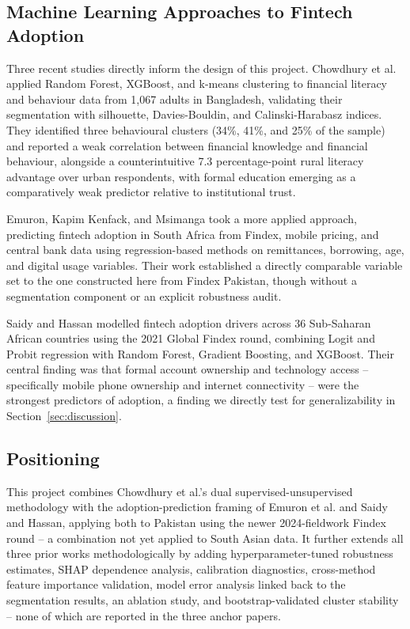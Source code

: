 \documentclass[conference]{IEEEtran}
\begin{document}
\subsection{Machine Learning Approaches to Fintech Adoption}
\label{subsec:ml_approaches_fintech_adoption}
Three recent studies directly inform the design of this project. Chowdhury et al. \cite{chowdhury2026} applied Random Forest, XGBoost, and k-means clustering to financial literacy and behaviour data from 1{,}067 adults in Bangladesh, validating their segmentation with silhouette, Davies-Bouldin, and Calinski-Harabasz indices. They identified three behavioural clusters (34\%, 41\%, and 25\% of the sample) and reported a weak correlation between financial knowledge and financial behaviour, alongside a counterintuitive 7.3 percentage-point rural literacy advantage over urban respondents, with formal education emerging as a comparatively weak predictor relative to institutional trust.
 
Emuron, Kapim Kenfack, and Msimanga \cite{emuron2025} took a more applied approach, predicting fintech adoption in South Africa from Findex, mobile pricing, and central bank data using regression-based methods on remittances, borrowing, age, and digital usage variables. Their work established a directly comparable variable set to the one constructed here from Findex Pakistan, though without a segmentation component or an explicit robustness audit.
 
Saidy and Hassan \cite{saidy2025} modelled fintech adoption drivers across 36 Sub-Saharan African countries using the 2021 Global Findex round, combining Logit and Probit regression with Random Forest, Gradient Boosting, and XGBoost. Their central finding was that formal account ownership and technology access -- specifically mobile phone ownership and internet connectivity -- were the strongest predictors of adoption, a finding we directly test for generalizability in Section~\ref{sec:discussion}.
 
\subsection{Positioning}
\label{subsec:positioning}
This project combines Chowdhury et al.'s dual supervised-unsupervised methodology with the adoption-prediction framing of Emuron et al. and Saidy and Hassan, applying both to Pakistan using the newer 2024-fieldwork Findex round \cite{worldbank2025} -- a combination not yet applied to South Asian data. It further extends all three prior works methodologically by adding hyperparameter-tuned robustness estimates, SHAP dependence analysis, calibration diagnostics, cross-method feature importance validation, model error analysis linked back to the segmentation results, an ablation study, and bootstrap-validated cluster stability -- none of which are reported in the three anchor papers.
 
\end{document}
